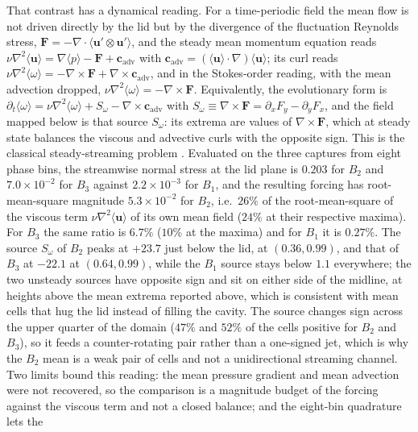 \documentclass[11pt,a4paper]{article}
\begin{document}
That contrast has a dynamical reading. For a time-periodic field the mean flow is
not driven directly by the lid but by the divergence of the fluctuation Reynolds
stress, $\mathbf{F}=-\nabla\cdot\langle\mathbf{u}'\otimes\mathbf{u}'\rangle$, and the
steady mean momentum equation reads
$\nu\nabla^2\langle\mathbf{u}\rangle=\nabla\langle p\rangle-\mathbf{F}
+\mathbf{c}_{\mathrm{adv}}$ with
$\mathbf{c}_{\mathrm{adv}}=(\langle\mathbf{u}\rangle\cdot\nabla)\langle\mathbf{u}\rangle$;
its curl reads
$\nu\nabla^2\langle\omega\rangle=-\nabla\times\mathbf{F}
+\nabla\times\mathbf{c}_{\mathrm{adv}}$, and in the Stokes-order reading, with the
mean advection dropped, $\nu\nabla^2\langle\omega\rangle=-\nabla\times\mathbf{F}$.
Equivalently, the evolutionary form is
$\partial_t\langle\omega\rangle=\nu\nabla^2\langle\omega\rangle+S_\omega
-\nabla\times\mathbf{c}_{\mathrm{adv}}$ with
$S_\omega\equiv\nabla\times\mathbf{F}=\partial_xF_y-\partial_yF_x$, and the field
mapped below is that source $S_\omega$: its extrema are values of
$\nabla\times\mathbf{F}$, which at steady state balances the viscous and advective
curls with the opposite sign. This is the
classical steady-streaming problem \cite{riley2001streaming}. Evaluated on the
three captures from eight phase bins, the streamwise normal stress at the lid plane
is $0.203$ for $B_2$ and $7.0\times10^{-2}$ for $B_3$ against
$2.2\times10^{-3}$ for $B_1$, and the resulting forcing has root-mean-square
magnitude $5.3\times10^{-2}$ for $B_2$, i.e.\ $26\%$ of the root-mean-square of the
viscous term $\nu\nabla^2\langle\mathbf{u}\rangle$ of its own mean field ($24\%$ at
their respective maxima). For $B_3$ the same ratio is $6.7\%$ ($10\%$ at the
maxima) and for $B_1$ it is $0.27\%$. The source $S_\omega$
of $B_2$ peaks at $+23.7$ just below the lid, at $(0.36,0.99)$, and that of $B_3$ at
$-22.1$ at $(0.64,0.99)$, while the $B_1$ source stays below $1.1$ everywhere;
the two unsteady sources have opposite sign and sit on either side of the midline,
at heights above the mean extrema reported above, which is consistent with mean
cells that hug the lid instead of filling the cavity. The source changes sign across
the upper quarter of the domain ($47\%$ and $52\%$ of the cells positive for $B_2$
and $B_3$), so it feeds a counter-rotating pair rather than a one-signed jet, which
is why the $B_2$ mean is a weak pair of cells and not a unidirectional streaming
channel.
Two limits bound this reading: the mean pressure gradient and mean advection were
not recovered, so the comparison is a magnitude budget of the forcing against the
viscous term and not a closed balance; and the eight-bin quadrature lets the
\end{document}
